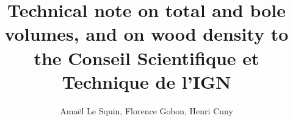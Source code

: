 \documentclass[oneside]{caesar_book}
\title{Technical note on total and bole volumes, and on wood density to the Conseil Scientifique et Technique de l'IGN}
\author{Amaël Le Squin, Florence Gohon, Henri Cuny}
\begin{document}
\frontmatter
\maketitlepage
\tableofcontents
\mainmatter








\appendix


\printbibliography
\end{document}
